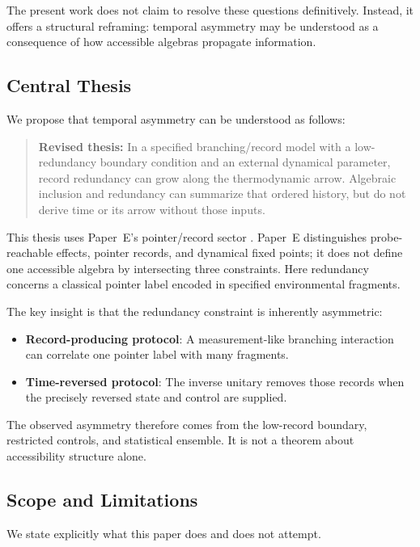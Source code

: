 \documentclass[12pt,a4paper]{article}
\begin{document}
The present work does not claim to resolve these questions definitively. Instead, it offers a structural reframing: temporal asymmetry may be understood as a consequence of how accessible algebras propagate information.

\subsection{Central Thesis}

We propose that temporal asymmetry can be understood as follows:

\begin{quote}
\textbf{Revised thesis:} In a specified branching/record model with a low-redundancy boundary condition and an external dynamical parameter, record redundancy can grow along the thermodynamic arrow.  Algebraic inclusion and redundancy can summarize that ordered history, but do not derive time or its arrow without those inputs.
\end{quote}

This thesis uses Paper~E's pointer/record sector \cite{Liu2026PaperE}.  Paper~E distinguishes probe-reachable effects, pointer records, and dynamical fixed points; it does not define one accessible algebra by intersecting three constraints.  Here redundancy concerns a classical pointer label encoded in specified environmental fragments.

The key insight is that the redundancy constraint is inherently asymmetric:
\begin{itemize}
    \item \textbf{Record-producing protocol}: A measurement-like branching interaction can correlate one pointer label with many fragments.
    \item \textbf{Time-reversed protocol}: The inverse unitary removes those records when the precisely reversed state and control are supplied.
\end{itemize}

The observed asymmetry therefore comes from the low-record boundary, restricted controls, and statistical ensemble.  It is not a theorem about accessibility structure alone.

\subsection{Scope and Limitations}

We state explicitly what this paper does and does not attempt.
\end{document}
